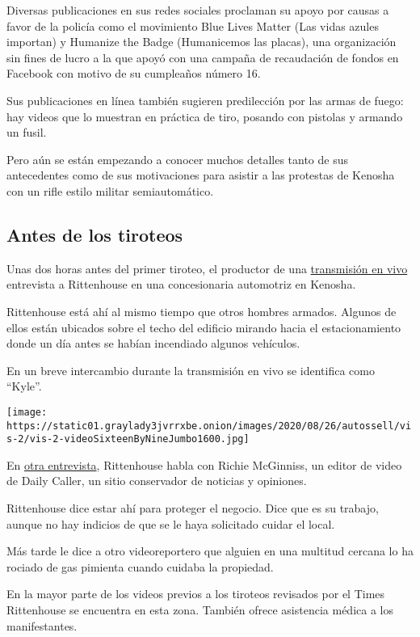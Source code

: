 Diversas publicaciones en sus redes sociales proclaman su apoyo por
causas a favor de la policía como el movimiento Blue Lives Matter (Las
vidas azules importan) y Humanize the Badge (Humanicemos las placas),
una organización sin fines de lucro a la que apoyó con una campaña de
recaudación de fondos en Facebook con motivo de su cumpleaños número 16.

Sus publicaciones en línea también sugieren predilección por las armas
de fuego: hay videos que lo muestran en práctica de tiro, posando con
pistolas y armando un fusil.

Pero aún se están empezando a conocer muchos detalles tanto de sus
antecedentes como de sus motivaciones para asistir a las protestas de
Kenosha con un rifle estilo militar semiautomático.

\hypertarget{antes-de-los-tiroteos}{%
\subsection{Antes de los tiroteos}\label{antes-de-los-tiroteos}}

Unas dos horas antes del primer tiroteo, el productor de una
\href{https://www.facebookcorewwwi.onion/kristantharris/videos/10164052138640646/?t=2}{transmisión
en vivo} entrevista a Rittenhouse en una concesionaria automotriz en
Kenosha.

Rittenhouse está ahí al mismo tiempo que otros hombres armados. Algunos
de ellos están ubicados sobre el techo del edificio mirando hacia el
estacionamiento donde un día antes se habían incendiado algunos
vehículos.

En un breve intercambio durante la transmisión en vivo se identifica
como ``Kyle''.

\texttt{[image: https://static01.graylady3jvrrxbe.onion/images/2020/08/26/autossell/vis-2/vis-2-videoSixteenByNineJumbo1600.jpg]}

En
\href{https://twitter.com/RichieMcGinniss/status/1298657958205820928?s=20}{otra
entrevista}, Rittenhouse habla con Richie McGinniss, un editor de video
de Daily Caller, un sitio conservador de noticias y opiniones.

Rittenhouse dice estar ahí para proteger el negocio. Dice que es su
trabajo, aunque no hay indicios de que se le haya solicitado cuidar el
local.

Más tarde le dice a otro videoreportero que alguien en una multitud
cercana lo ha rociado de gas pimienta cuando cuidaba la propiedad.

En la mayor parte de los videos previos a los tiroteos revisados por el
Times Rittenhouse se encuentra en esta zona. También ofrece asistencia
médica a los manifestantes.

